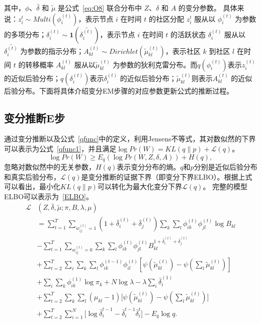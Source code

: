 其中，$\phi$、$\bar{\delta}$ 和 $\tilde{\mu}$ 是公式~\ref{eq:O8} 联合分布中 $Z$、$\delta$ 和 $A$ 的变分参数。  
具体来说：$z_i^t \sim Multi(\phi_i^{(t)})$，表示节点 $i$ 在时间 $t$ 的社区分配 $z_i^t$ 服从以 $\phi_i^{(t)}$ 为参数的多项分布；$\delta_i^{(t)} \sim \mathbf{1}(\bar{\delta_i^{(t)}})$，表示节点 $i$ 在时间 $t$ 的活跃状态 $\delta_i^{(t)}$ 服从以 $\bar{\delta_i^{(t)}}$ 为参数的指示分布；$A_{kl}^{(t)} \sim Dirichlet(\tilde{\mu}_{kl}^{(t)})$，表示社区 $k$ 到社区 $l$ 在时间 $t$ 的转移概率 $A_{kl}^{(t)}$ 服从以$\tilde{\mu}_{kl}^{(t)}$ 为参数的狄利克雷分布。而$q(\phi_i^{(t)})$表示$z_i^{(t)}$ 的近似后验分布；$q(\delta_i^{(t)})$表示$\delta_i^{(t)}$ 的近似后验分布；$\tilde{\mu}_{kl}^{(t)}$则表示$A_{kl}^{(t)}$ 的近似后验分布。下面将具体介绍变分EM步骤的对应参数更新公式的推断过程。
\subsection{变分推断E步}
通过变分推断以及公式~\ref{qfunc}中的定义，利用Jensens不等式，其对数似然的下界可以表示为公式~\ref{qfunc1}，并且满足$\log Pr(W) = KL(q \| p) + \mathscr{L}(q)$。  
\begin{equation}
\log Pr(W)\ge E_q(\log Pr(W, Z,\delta, A) ) + H(q),
\label{qfunc1}
\end{equation}
忽略对数似然中的无关参数，$H(q)$表示变分分布的熵。$q$和$p$分别是近似后验分布和真实后验分布，$\mathscr{L}(q)$是变分推断的证据下界（即变分下界ELBO）。根据上式可以看出，最小化$KL(q \| p)$可以转化为最大化变分下界$\mathscr{L}(q)$。  
完整的模型ELBO可以表示为~\ref{ELBO}。
\begin{align}
 \mathscr{L} & (Z,\bar{\delta},\tilde{\mu};\pi,B,\lambda,\mu) \nonumber \\
& = \sum_{t=1}^T \sum_{w_{ij}^{(t)}=1} (1+\bar{\delta}_i^{(t)}+\bar{\delta}_j^{(t)}) \sum_k \sum_l \phi_{ik}^{(t)}\phi_{jl}^{(t)} \log B_{kl} \nonumber\\
& -\sum_{t=1}^T \sum_{w_{ij}^{(t)}=0} \sum_k \sum_l \phi_{ik}^{(t)}\phi_{jl}^{(t)}  B_{kl}^{1+\bar{\delta}_i^{(t)}+\bar{\delta}_j^{(t)}} \nonumber\\
& +\sum_{t=2}^T \sum_i \sum_k \sum_l \phi_{ik}^{(t-1)}\phi_{il}^{(t)} [\psi(\tilde{\mu}_{kl}^{(t)}) - \psi(\sum_l \tilde{\mu}_{kl}^{(t)})]  \nonumber\\
& +\sum_i \sum_k \phi_{ik}^{(1)} \log \pi_k +  N\log \lambda -\lambda \sum_i \bar{\delta}_i^{(1)}  \nonumber \\
& +\sum_{t=2}^T \sum_k \sum_l(\mu_{kl} - 1) \Big[\psi(\tilde{\mu}_{kl}^{(t)}) - \psi(\sum_l \tilde{\mu}_{kl}^{(t)})\Big]  \nonumber\\
& + \sum_{t=2}^{T} \sum_{i=1}^N \big[\log \bar{\delta}_i^{t-1} - \bar{\delta}_i^{t-1} \bar{\delta}_i^{t}\big] -E_q \log q.
\label{ELBO}
\end{align}


